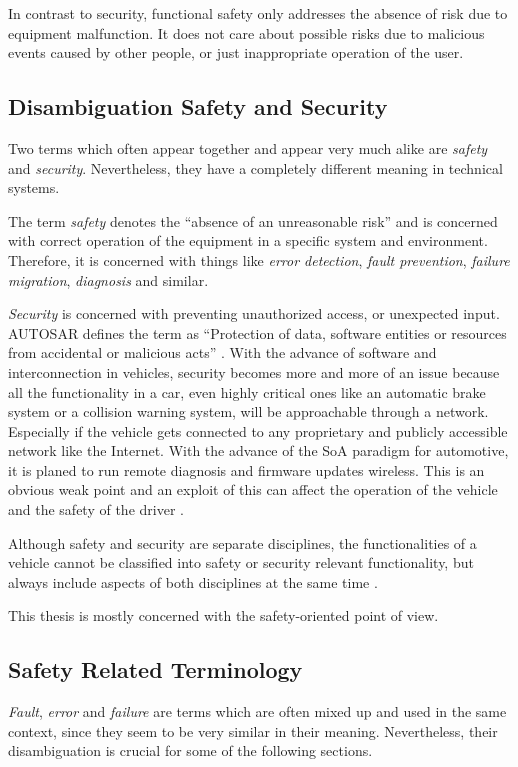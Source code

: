 In contrast to security, functional safety only addresses the absence of risk due to equipment malfunction. It does not care about possible risks due to malicious events caused by other people, or just inappropriate operation of the user.


\subsection{Disambiguation Safety and Security}
Two terms which often appear together and appear very much alike are \emph{safety} and \emph{security}. Nevertheless, they have a completely different meaning in technical systems.

The term \emph{safety} denotes the ``absence of an unreasonable risk'' \cite{autosar_glossary} \cite{iso26262:1} and is concerned with correct operation of the equipment in a specific system and environment. Therefore, it is concerned with things like \emph{error detection}, \emph{fault prevention}, \emph{failure migration}, \emph{diagnosis} and similar.

\emph{Security} is concerned with preventing unauthorized access, or unexpected input. \mbox{AUTOSAR} defines the term as ``Protection of data, software entities or resources from accidental or malicious acts'' \cite{autosar_glossary}. With the advance of software and interconnection in vehicles, security becomes more and more of an issue because all the functionality in a car, even highly critical ones like an automatic brake system or a collision warning system, will be approachable through a network. Especially if the vehicle gets connected to any proprietary and publicly accessible network like the Internet. With the advance of the SoA paradigm for automotive, it is planed to run remote diagnosis and firmware updates wireless. This is an obvious weak point and an exploit of this can affect the operation of the vehicle and the safety of the driver \cite{nilsson2008}.

Although safety and security are separate disciplines, the functionalities of a vehicle cannot be classified into safety or security relevant functionality, but always include aspects of both disciplines at the same time \cite{nilsson2008}. 

This thesis is mostly concerned with the safety-oriented point of view.


\subsection{Safety Related Terminology}
\label{sec:fault,error,failure}
\emph{Fault}, \emph{error} and \emph{failure} are terms which are often mixed up and used in the same context, since they seem to be very similar in their meaning. Nevertheless, their disambiguation is crucial for some of the following sections.



